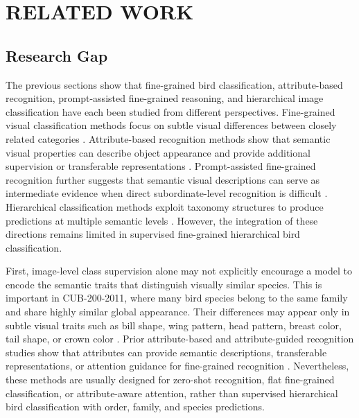 \chapter{RELATED WORK}

 

 

 

 

 

\section{Research Gap}

The previous sections show that fine-grained bird classification, attribute-based recognition, prompt-assisted fine-grained reasoning, and hierarchical image classification have each been studied from different perspectives. Fine-grained visual classification methods focus on subtle visual differences between closely related categories \cite{Fine-grainedSurvey, Zhou_2016_CVPR, TransIFC}. Attribute-based recognition methods show that semantic visual properties can describe object appearance and provide additional supervision or transferable representations \cite{farhadi2009attributes, lampert2014attributebased}. Prompt-assisted fine-grained recognition further suggests that semantic visual descriptions can serve as intermediate evidence when direct subordinate-level recognition is difficult \cite{liu2024democratizing}. Hierarchical classification methods exploit taxonomy structures to produce predictions at multiple semantic levels \cite{silla2011survey, chang2021your, Chen_2022_CVPR, wang2023transhp, park2025visually}. However, the integration of these directions remains limited in supervised fine-grained hierarchical bird classification.

First, image-level class supervision alone may not explicitly encourage a model to encode the semantic traits that distinguish visually similar species. This is important in CUB-200-2011, where many bird species belong to the same family and share highly similar global appearance. Their differences may appear only in subtle visual traits such as bill shape, wing pattern, head pattern, breast color, tail shape, or crown color \cite{wah2011cub}. Prior attribute-based and attribute-guided recognition studies show that attributes can provide semantic descriptions, transferable representations, or attention guidance for fine-grained recognition \cite{farhadi2009attributes, lampert2014attributebased, liu2017localizing, han2018attribute, huynh2020DenseAttribute}. Nevertheless, these methods are usually designed for zero-shot recognition, flat fine-grained classification, or attribute-aware attention, rather than supervised hierarchical bird classification with order, family, and species predictions.

